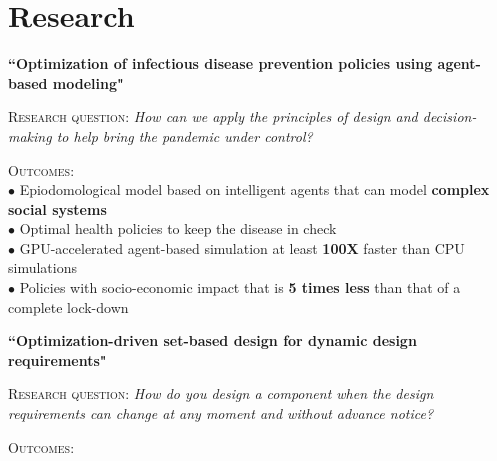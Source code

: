 \documentclass[10pt]{article} %
\begin{document}
\makeprofile %


\vspace{-\baselineskip} %

\section{Research}

{\raggedright\textbf{``Optimization of infectious disease prevention policies using agent-based modeling"}}

\textsc{Research question:} \textit{ How can we apply the principles of design and decision-making to help bring the pandemic under control?}

\textsc{Outcomes:}\vspace{-0.5em} ~~~~\\[1pt]

$\bullet$ Epiodomological model based on intelligent agents that can model \textbf{complex social systems}\\[1pt]
$\bullet$ Optimal health policies to keep the disease in check\\[1pt]
$\bullet$ GPU-accelerated agent-based simulation at least \textbf{100X} faster than CPU simulations\\[1pt]
$\bullet$ Policies with socio-economic impact that is \textbf{5 times less} than that of a complete lock-down

\medskip %

{\raggedright\textbf{``Optimization-driven set-based design for dynamic design requirements"}}

\textsc{Research question:} \textit{How do you design a component when the design requirements can change at any moment and without advance notice?}

\textsc{Outcomes:}\vspace{-0.5em} ~~~~~\\[1pt]
\end{document}

